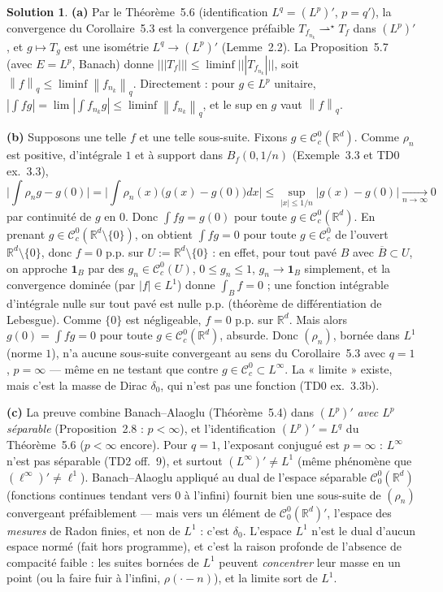 \documentclass[11pt,a4paper]{article}
\newcommand{\R}{\mathbb{R}}
\newcommand{\adh}[1]{\overline{#1}}
\newcommand{\Bf}{B_f}
\newcommand{\norm}[1]{\left\|#1\right\|}
\newcommand{\opnorm}[1]{|\!|\!|#1|\!|\!|}
\newcommand{\Cz}{\mathcal{C}^0}
\newcommand{\Cc}{\mathcal{C}^0_c}
\theoremstyle{definition}
\newtheorem*{solution}{Solution}
\begin{document}
\begin{solution}
\noindent\textbf{(a)} Par le Théorème~5.6 (identification $L^q=(L^p)'$, $p=q'$), la convergence du Corollaire~5.3 est la convergence préfaible $T_{f_{n_k}}\rightharpoonup^\star T_f$ dans $(L^p)'$, et $g\mapsto T_g$ est une isométrie $L^q\to(L^p)'$ (Lemme~2.2). La Proposition~5.7 (avec $E=L^p$, Banach) donne $\opnorm{T_f}\le\liminf\opnorm{T_{f_{n_k}}}$, soit $\norm f_q\le\liminf\norm{f_{n_k}}_q$. Directement : pour $g\in L^p$ unitaire, $|\int fg|=\lim|\int f_{n_k}g|\le\liminf\norm{f_{n_k}}_q$, et le sup en $g$ vaut $\norm f_q$.

\medskip
\noindent\textbf{(b)} Supposons une telle $f$ et une telle sous-suite. Fixons $g\in\Cc(\R^d)$. Comme $\rho_{n}$ est positive, d'intégrale $1$ et à support dans $\Bf(0,1/n)$ (Exemple~3.3 et TD0 ex.~3.3),
\[
\Big|\int\rho_{n}g-g(0)\Big|=\Big|\int\rho_{n}(x)\big(g(x)-g(0)\big)dx\Big|\le\sup_{|x|\le1/n}|g(x)-g(0)|\xrightarrow[n\to\infty]{}0
\]
par continuité de $g$ en $0$. Donc $\int fg=g(0)$ pour toute $g\in\Cc(\R^d)$. En prenant $g\in\Cc(\R^d\setminus\{0\})$, on obtient $\int fg=0$ pour toute $g\in\Cc$ de l'ouvert $\R^d\setminus\{0\}$, donc $f=0$ p.p. sur $U:=\R^d\setminus\{0\}$ : en effet, pour tout pavé $B$ avec $\adh B\subset U$, on approche $\mathbf 1_B$ par des $g_n\in\Cc(U)$, $0\le g_n\le1$, $g_n\to\mathbf 1_B$ simplement, et la convergence dominée (par $|f|\in L^1$) donne $\int_Bf=0$ ; une fonction intégrable d'intégrale nulle sur tout pavé est nulle p.p. (théorème de différentiation de Lebesgue). Comme $\{0\}$ est négligeable, $f=0$ p.p. sur $\R^d$. Mais alors $g(0)=\int fg=0$ pour toute $g\in\Cc(\R^d)$, absurde. Donc $(\rho_n)$, bornée dans $L^1$ (norme $1$), n'a aucune sous-suite convergeant au sens du Corollaire~5.3 avec $q=1$, $p=\infty$ — même en ne testant que contre $g\in\Cc\subset L^\infty$. La « limite » existe, mais c'est la masse de Dirac $\delta_0$, qui n'est pas une fonction (TD0 ex.~3.3b).

\medskip
\noindent\textbf{(c)} La preuve combine Banach--Alaoglu (Théorème~5.4) dans $(L^p)'$ \emph{avec $L^p$ séparable} (Proposition~2.8 : $p<\infty$), et l'identification $(L^p)'=L^q$ du Théorème~5.6 (\emph{$p<\infty$} encore). Pour $q=1$, l'exposant conjugué est $p=\infty$ : $L^\infty$ n'est pas séparable (TD2 off.~9), et surtout $(L^\infty)'\ne L^1$ (même phénomène que $(\ell^\infty)'\ne\ell^1$). Banach--Alaoglu appliqué au dual de l'espace séparable $\Cz_0(\R^d)$ (fonctions continues tendant vers $0$ à l'infini) fournit bien une sous-suite de $(\rho_n)$ convergeant préfaiblement — mais vers un élément de $\Cz_0(\R^d)'$, l'espace des \emph{mesures} de Radon finies, et non de $L^1$ : c'est $\delta_0$. L'espace $L^1$ n'est le dual d'aucun espace normé (fait hors programme), et c'est la raison profonde de l'absence de compacité faible : les suites bornées de $L^1$ peuvent \emph{concentrer} leur masse en un point (ou la faire fuir à l'infini, $\rho(\cdot-n)$), et la limite sort de $L^1$.
\end{solution}
\end{document}
